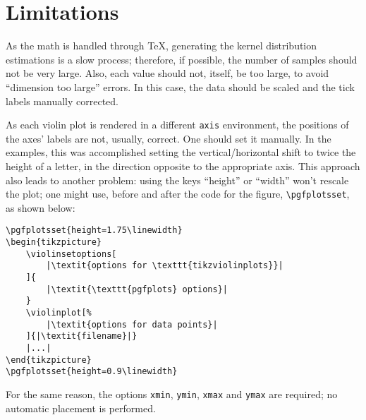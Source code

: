 \documentclass{article}
\begin{document}
\section{Limitations}

As the math is handled through \TeX, generating the kernel distribution
estimations is a slow process; therefore, if possible, the number of samples
should not be very large. Also, each value should not, itself, be too large,
to avoid ``dimension too large'' errors. In this case, the data should be scaled
and the tick labels manually corrected.

As each violin plot is rendered in a different \texttt{axis} environment,
the positions of the axes' labels are not, usually, correct. One should
set it manually. In the examples, this was accomplished setting the
vertical/horizontal shift to twice the height of a letter, in the direction
opposite to the appropriate axis. This approach also leads to another problem:
using the keys ``height'' or ``width'' won't rescale the plot; one might use,
before and after the code for the figure, \texttt{\textbackslash pgfplotsset},
as shown below:


\begin{verbatim}
\pgfplotsset{height=1.75\linewidth}
\begin{tikzpicture}
	\violinsetoptions[
		|\textit{options for \texttt{tikzviolinplots}}|
	]{
		|\textit{\texttt{pgfplots} options}|
	}
	\violinplot[%
		|\textit{options for data points}|
	]{|\textit{filename}|}
	|...|
\end{tikzpicture}
\pgfplotsset{height=0.9\linewidth}
\end{verbatim}

For the same reason, the options \texttt{xmin}, \texttt{ymin}, \texttt{xmax}
and \texttt{ymax} are required; no automatic placement is performed.
\end{document}
